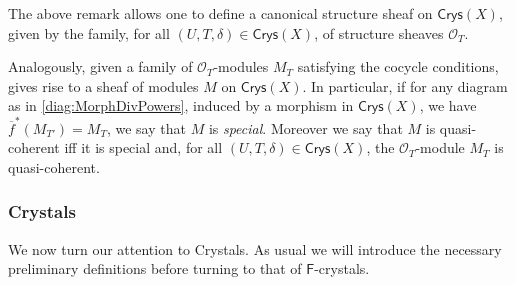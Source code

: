 \documentclass[../Main]{subfiles}
\begin{document}
\begin{rem}[]
	The above remark allows one to define a canonical structure sheaf
	on $\mathsf{Crys}(X)$, given by the family, for all $\left(U, T, \delta\right) \in
	\mathsf{Crys}(X)$, of structure sheaves $\mathcal{O}_{ T }$.

	Analogously, given a family of $\mathcal{O}_{ T }$-modules $M_T$
	satisfying the cocycle conditions, gives rise to a sheaf of modules
	$M$ on $\mathsf{Crys}(X)$.
	In particular, if for any diagram as in \cref{diag:MorphDivPowers}, induced
	by a morphism in $\mathsf{Crys}(X)$, we have $\overline{f}^*(M_{T'}) = M_T$,
	we say that $M$ is {\em special}.
	Moreover we say that $M$ is quasi-coherent iff it is special and, for all
	$\left(U, T, \delta\right) \in \mathsf{Crys}(X)$, the $\mathcal{O}_{ T }$-module
	$M_T$ is quasi-coherent.
\end{rem}


\subsubsection{Crystals}
We now turn our attention to Crystals.
As usual we will introduce the necessary preliminary definitions before 
turning to that of $\mathsf{F}$-crystals.
\end{document}
